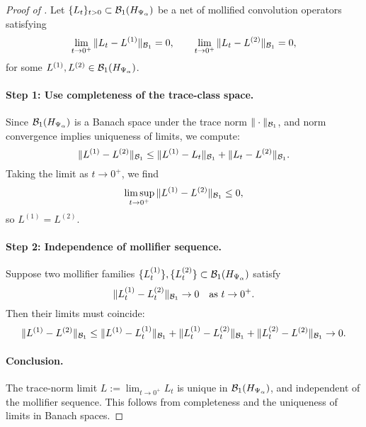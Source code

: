 \begin{proof}[Proof of ]
Let \( \{L_t\}_{t > 0} \subset \mathcal{B}_1(H_{\Psi_\alpha}) \) be a net of mollified convolution operators satisfying
\[
\lim_{t \to 0^+} \|L_t - L^{(1)}\|_{\mathcal{B}_1} = 0, \qquad
\lim_{t \to 0^+} \|L_t - L^{(2)}\|_{\mathcal{B}_1} = 0,
\]
for some \( L^{(1)}, L^{(2)} \in \mathcal{B}_1(H_{\Psi_\alpha}) \).

\paragraph{Step 1: Use completeness of the trace-class space.}
Since \( \mathcal{B}_1(H_{\Psi_\alpha}) \) is a Banach space under the trace norm \( \|\cdot\|_{\mathcal{B}_1} \), and norm convergence implies uniqueness of limits, we compute:
\[
\|L^{(1)} - L^{(2)}\|_{\mathcal{B}_1}
\le \|L^{(1)} - L_t\|_{\mathcal{B}_1} + \|L_t - L^{(2)}\|_{\mathcal{B}_1}.
\]
Taking the limit as \( t \to 0^+ \), we find
\[
\limsup_{t \to 0^+} \|L^{(1)} - L^{(2)}\|_{\mathcal{B}_1} \le 0,
\]
so \( L^{(1)} = L^{(2)} \).

\paragraph{Step 2: Independence of mollifier sequence.}
Suppose two mollifier families \( \{L_t^{(1)}\}, \{L_t^{(2)}\} \subset \mathcal{B}_1(H_{\Psi_\alpha}) \) satisfy
\[
\|L_t^{(1)} - L_t^{(2)}\|_{\mathcal{B}_1} \to 0 \quad \text{as } t \to 0^+.
\]
Then their limits must coincide:
\[
\|L^{(1)} - L^{(2)}\|_{\mathcal{B}_1}
\le \|L^{(1)} - L_t^{(1)}\|_{\mathcal{B}_1}
+ \|L_t^{(1)} - L_t^{(2)}\|_{\mathcal{B}_1}
+ \|L_t^{(2)} - L^{(2)}\|_{\mathcal{B}_1} \to 0.
\]

\paragraph{Conclusion.}
The trace-norm limit \( L := \lim_{t \to 0^+} L_t \) is unique in \( \mathcal{B}_1(H_{\Psi_\alpha}) \), and independent of the mollifier sequence. This follows from completeness and the uniqueness of limits in Banach spaces.
\end{proof}
